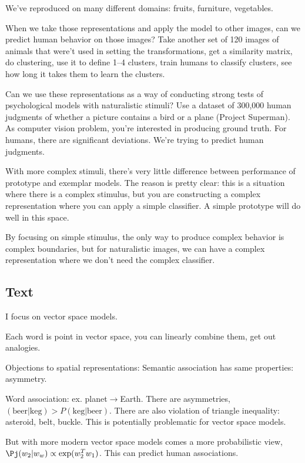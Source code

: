 We've reproduced on many different domains: fruits, furniture, vegetables.

When we take those representations and apply the model to other images, can we predict human behavior on those images? Take another set of 120 images of animals that were't used in setting the transformations, get a similarity matrix, do clustering, use it to define 1--4 clusters, train humans to classify clusters, see how long it takes them to learn the clusters. 

Can we use these representations as a way of conducting strong tests of psychological models with naturalistic stimuli? Use a dataset of 300,000 human judgments of whether a picture contains a bird or a plane (Project Superman). As computer vision problem, you're interested in producing ground truth. For humans, there are significant deviations. We're trying to predict human judgments.


With more complex stimuli, there's very little difference between performance of prototype and exemplar models. The reason is pretty clear: this is a situation where there is a complex stimulus, but you are constructing a complex representation where you can apply a simple classifier. 
A simple prototype will do well in this space. 

By focusing on simple stimulus, the only way to produce complex behavior is complex boundaries, but for naturalistic images, we can have a complex representation where we don't need the complex classifier.

\subsection{Text}

I focus on vector space models.

Each word is point in vector space, you can linearly combine them, get out analogies.

Objections to spatial representations:
Semantic association has same properties: asymmetry. 

Word association: ex. planet$\to$Earth.
There are asymmetries, $(\text{beer|keg})>P(\text{keg|beer})$. There are also violation of triangle inequality: asteroid, belt, buckle.
This is potentially problematic for vector space models.

But with more modern vector space models comes a more probabilistic view, $\Pj(w_2|w_w)\propto \exp(w_2^Tw_1)$.  This can predict human associations.

